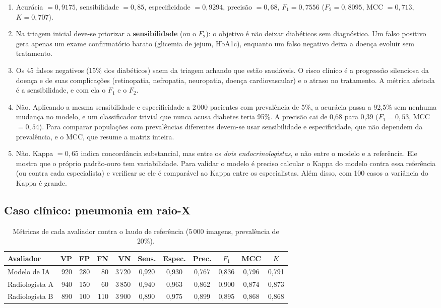 \documentclass[12pt,a4paper]{article}
\begin{document}
\begin{enumerate}
  \item Acurácia $= 0{,}9175$, sensibilidade $= 0{,}85$, especificidade $= 0{,}9294$, precisão $= 0{,}68$, $F_1 = 0{,}7556$ ($F_2 = 0{,}8095$, MCC $= 0{,}713$, $K = 0{,}707$).
  \item Na triagem inicial deve-se priorizar a \textbf{sensibilidade} (ou o $F_2$): o objetivo é não deixar diabéticos sem diagnóstico. Um falso positivo gera apenas um exame confirmatório barato (glicemia de jejum, HbA1c), enquanto um falso negativo deixa a doença evoluir sem tratamento.
  \item Os 45 falsos negativos (15\% dos diabéticos) saem da triagem achando que estão saudáveis. O risco clínico é a progressão silenciosa da doença e de suas complicações (retinopatia, nefropatia, neuropatia, doença cardiovascular) e o atraso no tratamento. A métrica afetada é a sensibilidade, e com ela o $F_1$ e o $F_2$.
  \item Não. Aplicando a mesma sensibilidade e especificidade a 2\,000 pacientes com prevalência de 5\%, a acurácia passa a 92,5\% sem nenhuma mudança no modelo, e um classificador trivial que nunca acusa diabetes teria 95\%. A precisão cai de 0,68 para 0,39 ($F_1 = 0{,}53$, MCC $= 0{,}54$). Para comparar populações com prevalências diferentes devem-se usar sensibilidade e especificidade, que não dependem da prevalência, e o MCC, que resume a matriz inteira.
  \item Não. Kappa $= 0{,}65$ indica concordância substancial, mas entre os \emph{dois endocrinologistas}, e não entre o modelo e a referência. Ele mostra que o próprio padrão-ouro tem variabilidade. Para validar o modelo é preciso calcular o Kappa do modelo contra essa referência (ou contra cada especialista) e verificar se ele é comparável ao Kappa entre os especialistas. Além disso, com 100 casos a variância do Kappa é grande.
\end{enumerate}

\subsection{Caso clínico: pneumonia em raio-X}

\begin{table}[H]
\centering
\caption{Métricas de cada avaliador contra o laudo de referência (5\,000 imagens, prevalência de 20\%).}
\label{tab:pneumonia}
\small
\begin{tabular}{lrrrrcccccc}
\toprule
Avaliador & VP & FP & FN & VN & Sens. & Espec. & Prec. & $F_1$ & MCC & $K$ \\
\midrule
Modelo de IA   & 920 & 280 & 80  & 3\,720 & 0,920 & 0,930 & 0,767 & 0,836 & 0,796 & 0,791 \\
Radiologista A & 940 & 150 & 60  & 3\,850 & 0,940 & 0,963 & 0,862 & 0,900 & 0,874 & 0,873 \\
Radiologista B & 890 & 100 & 110 & 3\,900 & 0,890 & 0,975 & 0,899 & 0,895 & 0,868 & 0,868 \\
\bottomrule
\end{tabular}
\end{table}
\end{document}
